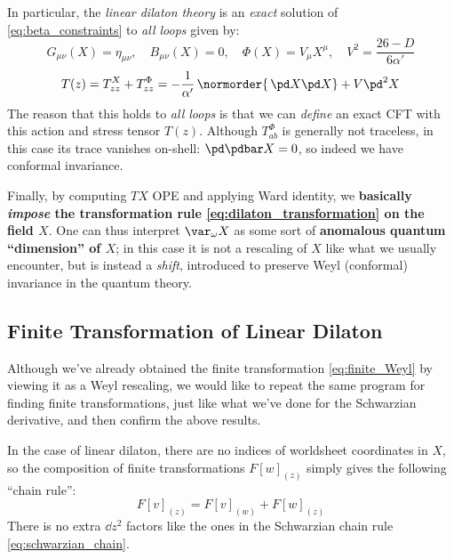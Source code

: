 \documentclass[a4paper
	,10pt
]{article}
\begin{document}
	In particular, the \textit{linear dilaton theory} is an \textit{exact} solution of \eqref{eq:beta_constraints} to \textit{all loops} given by:
	\begin{equation}
		G_{\mu\nu}(X) = \eta_{\mu\nu},
	\quad
		B_{\mu\nu}(X) = 0,
	\quad
		\Phi(X) = V_\mu X^\mu,
	\quad
		V^2 = \frac{26 - D}{6\alpha'}
	\end{equation}
	\vspace{-.5\baselineskip}
	\begin{equation}
		T(z)
		= T^X_{zz} + T^\Phi_{zz}
		= -\frac{1}{\alpha'}\,\normorder{\,\pd X \pd X}
			+ V \pd^2 X
	\end{equation}
	The reason that this holds to \textit{all loops} is that we can \textit{define} an exact CFT with this action and stress tensor $T(z)$. Although $T^\Phi_{ab}$ is generally not traceless, in this case its trace vanishes on-shell: $\pd \pdbar X = 0$, so indeed we have conformal invariance. 
	
	Finally, by computing $TX$ OPE and applying Ward identity, we \textbf{basically \textit{impose} the transformation rule \eqref{eq:dilaton_transformation} on the field $X$}. One can thus interpret $\var_\omega X$ as some sort of \textbf{anomalous quantum ``dimension'' of $X$}; in this case it is not a rescaling of $X$ like what we usually encounter, but is instead a \textit{shift}, introduced to preserve Weyl (conformal) invariance in the quantum theory. 
	
\subsection{Finite Transformation of Linear Dilaton}
	Although we've already obtained the finite transformation \eqref{eq:finite_Weyl} by viewing it as a Weyl rescaling, we would like to repeat the same program for finding finite transformations, just like what we've done for the Schwarzian derivative, and then confirm the above results. 
	
	In the case of linear dilaton, there are no indices of worldsheet coordinates in $X$, so the composition of finite transformations $F[w]_{(z)}$ simply gives the following ``chain rule'':
	\begin{equation}
		F[v]_{(z)} = F[v]_{(w)} + F[w]_{(z)}
	\end{equation}
	There is no extra $\dd{z}^2$ factors like the ones in the Schwarzian chain rule \eqref{eq:schwarzian_chain}. 
	
\end{document}
